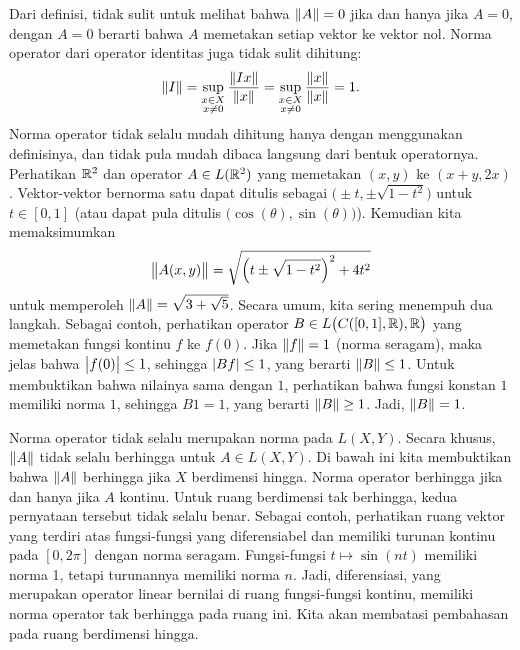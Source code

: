 Dari definisi, tidak sulit untuk melihat bahwa $\lVert {A} \rVert = 0$ jika dan
hanya jika $A = 0$, dengan $A=0$ berarti bahwa $A$ memetakan setiap vektor ke vektor nol.
Norma operator dari operator identitas juga tidak sulit dihitung:
\begin{equation*}
\lVert {I} \rVert =
\sup_{\substack{x \in X\\x\neq 0}} \frac{\lVert {Ix} \rVert}{\lVert {x} \rVert} 
=
\sup_{\substack{x \in X\\x\neq 0}} \frac{\lVert {x} \rVert}{\lVert {x} \rVert} 
= 1.
\end{equation*}
Norma operator tidak selalu mudah dihitung hanya dengan menggunakan definisinya,
dan tidak pula mudah dibaca langsung dari bentuk operatornya.
Perhatikan ${\mathbb{R}}^2$ dan operator $A \in L({\mathbb{R}}^2)$ yang memetakan
$(x,y)$ ke $(x+y,2x)$.  
Vektor-vektor bernorma satu dapat ditulis sebagai
$\bigl(\pm t, \pm \sqrt{1-t^2}\bigr)$
untuk $t \in [0,1]$
(atau dapat pula ditulis $\bigl(\cos(\theta), \sin(\theta) \bigr)$).
Kemudian kita memaksimumkan
\begin{equation*}
\bigl\lVert {A(x,y)} \bigr\rVert = \sqrt{{\left(t \pm \sqrt{1-t^2}\right)}^2+4t^2}
\end{equation*}
untuk memperoleh $\lVert {A} \rVert = \sqrt{3+\sqrt{5}}$.
Secara umum, kita sering menempuh dua langkah.  Sebagai contoh, perhatikan
operator
$B \in L\bigl(C([0,1],{\mathbb{R}}),{\mathbb{R}}\bigr)$
yang memetakan fungsi kontinu $f$ ke $f(0)$.  Jika $\lVert {f} \rVert = 1$ (norma seragam),
maka jelas bahwa $\bigl\lvert {f(0)} \bigr\rvert \leq 1$, sehingga $\lvert {Bf} \rvert \leq 1$, yang berarti
$\lVert {B} \rVert \leq 1$.
Untuk membuktikan bahwa nilainya sama dengan $1$, perhatikan bahwa fungsi konstan $1$ memiliki
norma $1$, sehingga $B1 = 1$, yang berarti $\lVert {B} \rVert \geq 1$.
Jadi, $\lVert {B} \rVert=1$.

Norma operator tidak selalu merupakan norma pada $L(X,Y)$.
Secara khusus,
$\lVert {A} \rVert$ tidak selalu berhingga untuk $A \in L(X,Y)$.
Di bawah ini kita membuktikan bahwa $\lVert {A} \rVert$ berhingga jika $X$ berdimensi hingga.
Norma operator berhingga jika dan hanya jika $A$ kontinu.
Untuk ruang berdimensi tak berhingga, kedua pernyataan tersebut tidak selalu benar.
Sebagai contoh,
perhatikan ruang vektor yang terdiri atas fungsi-fungsi yang diferensiabel dan memiliki turunan kontinu pada
$[0,2\pi]$ dengan norma seragam.  Fungsi-fungsi
$t \mapsto \sin(n t)$ memiliki norma 1, tetapi turunannya memiliki norma $n$.  Jadi,
diferensiasi, yang merupakan operator linear bernilai di ruang fungsi-fungsi
kontinu, memiliki norma operator tak berhingga pada ruang ini.
Kita akan membatasi pembahasan pada ruang berdimensi hingga.

